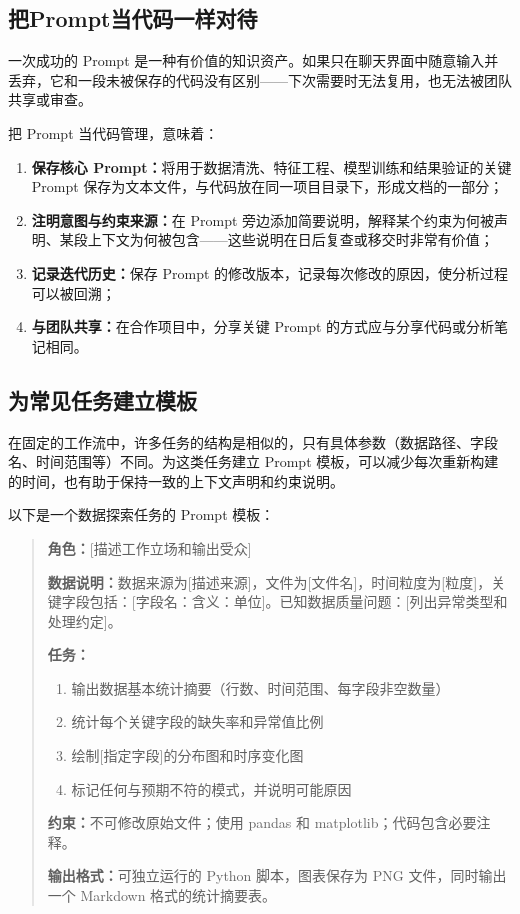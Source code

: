 \subsection{把Prompt当代码一样对待}

一次成功的 Prompt 是一种有价值的知识资产。如果只在聊天界面中随意输入并丢弃，它和一段未被保存的代码没有区别——下次需要时无法复用，也无法被团队共享或审查。

把 Prompt 当代码管理，意味着：

\begin{enumerate}
  \item \textbf{保存核心 Prompt：}将用于数据清洗、特征工程、模型训练和结果验证的关键 Prompt 保存为文本文件，与代码放在同一项目目录下，形成文档的一部分；
  \item \textbf{注明意图与约束来源：}在 Prompt 旁边添加简要说明，解释某个约束为何被声明、某段上下文为何被包含——这些说明在日后复查或移交时非常有价值；
  \item \textbf{记录迭代历史：}保存 Prompt 的修改版本，记录每次修改的原因，使分析过程可以被回溯；
  \item \textbf{与团队共享：}在合作项目中，分享关键 Prompt 的方式应与分享代码或分析笔记相同。
\end{enumerate}

\subsection{为常见任务建立模板}

在固定的工作流中，许多任务的结构是相似的，只有具体参数（数据路径、字段名、时间范围等）不同。为这类任务建立 Prompt 模板，可以减少每次重新构建的时间，也有助于保持一致的上下文声明和约束说明。

以下是一个数据探索任务的 Prompt 模板：

\begin{quote}
\textbf{角色：}[描述工作立场和输出受众]

\textbf{数据说明：}数据来源为[描述来源]，文件为[文件名]，时间粒度为[粒度]，关键字段包括：[字段名：含义：单位]。已知数据质量问题：[列出异常类型和处理约定]。

\textbf{任务：}
\begin{enumerate}
  \item 输出数据基本统计摘要（行数、时间范围、每字段非空数量）
  \item 统计每个关键字段的缺失率和异常值比例
  \item 绘制[指定字段]的分布图和时序变化图
  \item 标记任何与预期不符的模式，并说明可能原因
\end{enumerate}

\textbf{约束：}不可修改原始文件；使用 pandas 和 matplotlib；代码包含必要注释。

\textbf{输出格式：}可独立运行的 Python 脚本，图表保存为 PNG 文件，同时输出一个 Markdown 格式的统计摘要表。
\end{quote}

